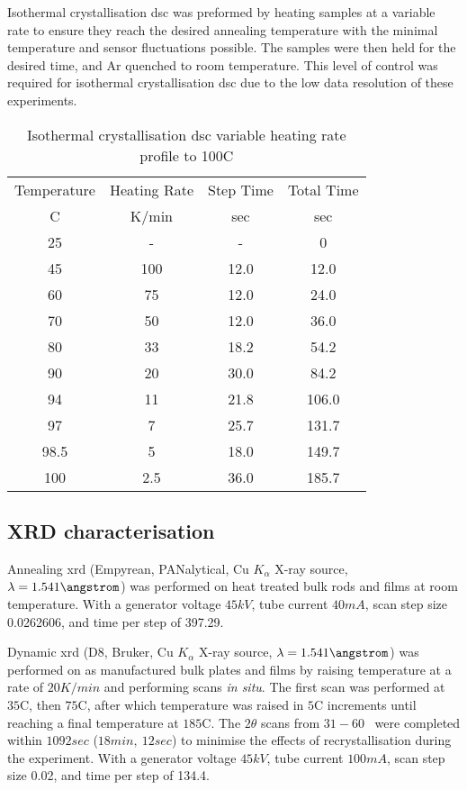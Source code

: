 \documentclass[a4paper,12pt,oneside]{report}%
\begin{document}
Isothermal crystallisation \acrshort{dsc} was preformed by heating samples at a variable rate to ensure they reach the desired annealing temperature with the minimal temperature and sensor fluctuations possible. The samples were then held for the desired time, and Ar quenched to room temperature. This level of control was required for isothermal crystallisation \acrshort{dsc} due to the low data resolution of these experiments. 

\begin{table}[h]
	\centering
	\caption{Isothermal crystallisation \acrshort{dsc} variable heating rate profile to 100\degree C}
	\begin{tabular}{cccc}
		\toprule
		Temperature & Heating Rate & Step Time & Total Time \\
		\degree C   & K/min & sec  & sec \\
		\midrule
		25   & -     & -    & 0          \\
		45   & 100   & 12.0 & 12.0       \\
		60   & 75    & 12.0 & 24.0       \\
		70   & 50    & 12.0 & 36.0       \\
		80   & 33    & 18.2 & 54.2       \\
		90   & 20    & 30.0 & 84.2       \\
		94   & 11    & 21.8 & 106.0      \\
		97   & 7     & 25.7 & 131.7      \\
		98.5 & 5     & 18.0 & 149.7      \\
		100  & 2.5   & 36.0 & 185.7      \\
		\bottomrule  
	\end{tabular}
	\label{tab:RampingDSC}
\end{table} 

\subsection{XRD characterisation}
Annealing \acrshort{xrd} (Empyrean, PANalytical, Cu $K_{\alpha}$ X-ray source, $\lambda = 1.541 \angstrom$) was performed on heat treated bulk rods and films at room temperature. 
With a generator voltage $45 kV$, tube current $40 mA$, scan step size 0.0262606, and time per step of 397.29. 

Dynamic \acrshort{xrd} (D8, Bruker, Cu $K_{\alpha}$ X-ray source, $\lambda = 1.541 \angstrom$) was performed on as manufactured bulk plates and films by raising temperature at a rate of $20 K/min$ and performing scans \textit{in situ}. The first scan was performed at $35$\degree C, then $75$\degree C, after which temperature was raised in $5$\degree C increments until reaching a final temperature at $185$\degree C. The $2 \theta$ scans from $31 - 60$\degree~ were completed within $1092 sec$ ($18min,~ 12sec$) to minimise the effects of recrystallisation during the experiment.
With a generator voltage $45 kV$, tube current $100 mA$, scan step size 0.02, and time per step of 134.4. 
\end{document}
